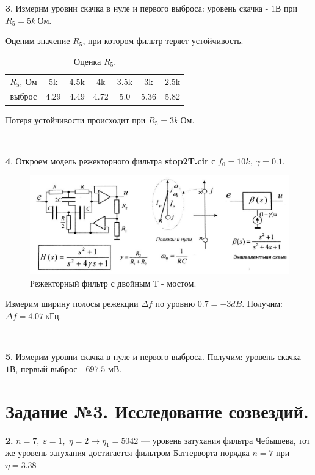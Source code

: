 \documentclass[a4paper, 12pt, twoside]{article}
\begin{document}
\textbf{3}. Измерим уровни скачка в нуле и первого выброса: уровень скачка - $1$В при $R_5 = 5k~\text{Ом}$.

Оценим значение $R_5$, при котором фильтр теряет устойчивость.
\begin{table}[H]
	\centering
	\caption{Оценка $R_5$.}
	\begin{tabular}{c|cccccc} \toprule
		$R_5,~\text{Ом}$ & 5k   & 4.5k & 4k   & 3.5k & 3k   & 2.5k \\
		выброс           & 4.29 & 4.49 & 4.72 & 5.0  & 5.36 & 5.82 \\ \bottomrule
	\end{tabular}
\end{table}

Потеря устойчивости происходит при $R_5 = 3k~\text{Ом}$.

~

\textbf{4}. Откроем модель режекторного фильтра \textbf{stop2T.cir} с $f_0 = 10k,~\gamma = 0.1$.

\begin{figure}[H]
	\centering
	\includegraphics[width =  0.9\linewidth]{rfiltr}
	\caption{Режекторный  фильтр с двойным Т - мостом.}
	\label{nus}
\end{figure}

Измерим ширину полосы режекции $\Delta f$ по уровню $0.7 = -3 dB$. Получим: $\Delta f = 4.07~\text{кГц}$.

~

\textbf{5}. Измерим уровни скачка в нуле и первого выброса. Получим: уровень скачка - $1$В, первый выброс - $697.5$ мВ.

\newpage

\section*{Задание №3. Исследование созвездий.}
\textbf{2.} $ n =7,\; \varepsilon=1,\; \eta=2 \rightarrow \eta_1 = 5042$ --- уровень затухания фильтра Чебышева, тот же уровень затухания достигается фильтром Баттерворта порядка $ n=7 $ при $ \eta = 3.38 $
\end{document}
